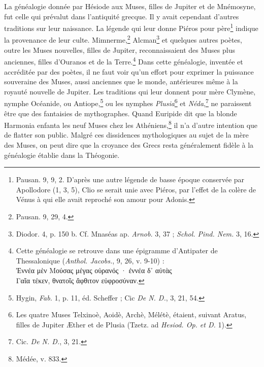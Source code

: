 \documentclass[a4paper, 11pt, oneside, polutonikogreek, french]{article}
\begin{document}
La généalogie donnée par Hésiode aux Muses, filles de Jupiter et de Mnémosyne, fut celle qui prévalut dans l'antiquité grecque. Il y avait cependant d'autres traditions sur leur naissance. La légende qui leur donne Piéros pour père\footnote{Pausan. 9, 9, 2. D'après une autre légende de basse époque conservée par Apollodore (1, 3, 5), Clio se serait unie avec Piéros, par l'effet de la colère de Vénus à qui elle avait reproché son amour pour Adonis.} indique la provenance de leur culte. Mimnerme,\footnote{Pausan. 9, 29, 4.} Alcman\footnote{Diodor. 4, p. 150 b. Cf. Mnaséas ap. \emph{Arnob.} 3, 37 ; \emph{Schol. Pind. Nem.} 3, 16.} et quelques autres poètes, outre les Muses nouvelles, filles de Jupiter, reconnaissaient des Muses plus anciennes, filles d'Ouranos et de la Terre.\footnote{Cette généalogie se retrouve dans une épigramme d'Antipater de Thessalonique (\emph{Anthol. Jacobs.}, 9, 26, v. 9-10) :\\\hspace*{5mm}Ἐννέα μὲν Μούσας μέγας οὐρανός · ἐννέα δ᾽ αὐτὰς\\\hspace*{5mm}Γαῖα τέκεν, θνατοῖς ἄφθιτον εὐφροσύναν.} Dans cette généalogie, inventée et accréditée par des poètes, il ne faut voir qu'un effort pour exprimer la puissance souveraine des Muses, aussi anciennes que le monde, antérieures même à la royauté nouvelle de Jupiter. Les traditions qui leur donnent pour mère Clymène, nymphe Océanide, ou Antiope,\footnote{Hygin, \emph{Fab.} 1, p. 11, éd. Scheffer ; Cic \emph{De N. D.}, 3, 21, 54.} ou les nymphes \emph{Plusia}\footnote{Les quatre Muses Telxinoè, Aoidè, Archè, Mélétè, étaient, suivant Aratus, filles de Jupiter Æther et de Plusia (Tzetz. ad \emph{Hesiod. Op. et D.} 1).} et \emph{Néda},\footnote{Cic. \emph{De N. D.}, 3, 21.} ne paraissent être que des fantaisies de mythographes. Quand Euripide dit que la blonde Harmonia enfanta les neuf Muses chez les Athéniens,\footnote{Médée, v. 833.} il n'a d'autre intention que de flatter son public. Malgré ces dissidences mythologiques au sujet de la mère des Muses, on peut dire que la croyance des Grecs resta généralement fidèle à la généalogie établie dans la Théogonie.
\end{document}
